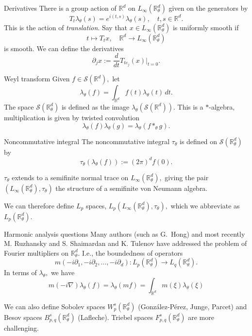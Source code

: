 \documentclass{beamer}
\numberwithin{equation}{section}
\theoremstyle{plain}
\theoremstyle{plain}
\theoremstyle{definition}
\theoremstyle{plain}
\theoremstyle{plain}
\theoremstyle{definition}
\newcommand{\Rl}{\mathbb{R}}
\newcommand{\Sc}{\mathcal{S}}
\begin{document}
\begin{frame}{Derivatives}
    There is a group action of $\Rl^d$ on $L_\infty(\Rl^d_\theta)$ given on the generators by
    \[
        T_{t}\lambda_\theta(s) = e^{i(t,s)}\lambda_\theta(s),\quad t,s\in \Rl^d.
    \]
    This is the action of \emph{translation}. Say that $x \in L_{\infty}(\Rl^d_\theta)$ is uniformly smooth if
    \[
        t\mapsto T_tx,\quad \Rl^d\to L_{\infty}(\Rl^d_\theta)
    \]
    is smooth. We can define the derivatives
    \[
        \partial_jx := \frac{d}{dt} T_{te_j}(x)|_{t=0}.
    \]
\end{frame}

\begin{frame}{Weyl transform}
    Given $f \in \Sc(\Rl^d),$ let
    \[
        \lambda_\theta(f) = \int_{\Rl^d} f(t)\lambda_\theta(t)\,dt.
    \]
    The space $\Sc(\Rl^d_\theta)$ is defined as the image $\lambda_\theta(\Sc(\Rl^d)).$ This is a $*$-algebra, multiplication is given by twisted convolution
    \[
        \lambda_\theta(f)\lambda_\theta(g) = \lambda_\theta(f\ast_\theta g).
    \]
\end{frame}

\begin{frame}{Noncommutative integral}
    The noncommutative integral $\tau_\theta$ is defined on $\Sc(\Rl^d_\theta)$ by
    \[
        \tau_\theta(\lambda_\theta(f)) := (2\pi)^d f(0).
    \]
    \begin{theorem}
        $\tau_\theta$ extends to a semifinite normal trace on $L_{\infty}(\Rl^d_\theta),$ giving the pair $(L_{\infty}(\Rl^d_\theta),\tau_\theta)$ the structure of a semifinite von Neumann algebra.
    \end{theorem}
    We can therefore define $L_p$ spaces, $L_p(L_{\infty}(\Rl^d_\theta),\tau_\theta),$ which we abbreviate as $L_p(\Rl^d_\theta).$
\end{frame}

\begin{frame}{Harmonic analysis questions}
    Many authors (such as G.~Hong) and most recently M. Ruzhansky and S. Shaimardan and K. Tulenov have addressed the problem of Fourier multipliers on $\Rl^d_\theta.$ I.e., the boundedness of operators
    \[
        m(-i\partial_1,-i\partial_2,\ldots,-i\partial_d):L_p(\Rl^d_\theta)\to L_{q}(\Rl^d_\theta).
    \]
    In terms of $\lambda_\theta,$ we have
    \[
        m(-i\nabla)\lambda_\theta(f) = \lambda_\theta(mf) = \int_{\mathbb{R}^d} m(\xi)\lambda_\theta(\xi)
    \]

    We can also define Sobolev spaces $W^s_p(\Rl^d_\theta)$ (Gonz\'alez-P\'erez, Junge, Parcet) and Besov spaces $B^s_{p,q}(\Rl^d_\theta)$ (Lafleche). Triebel spaces $F^s_{p,q}(\Rl^d_\theta)$ are more challenging.
\end{frame}
\end{document}
